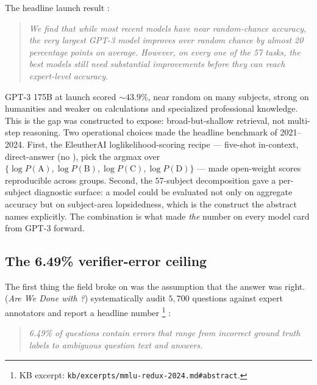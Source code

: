 The headline launch result
\citep[\S{}abstract]{hendrycks2021-mmlu}:

\begin{quote}\itshape
We find that while most recent models have near random-chance accuracy,
the very largest GPT-3 model improves over random chance by almost 20
percentage points on average. However, on every one of the 57 tasks,
the best models still need substantial improvements before they can
reach expert-level accuracy.
\end{quote}

GPT-3 175B at launch scored $\sim 43.9\%$, near random on many subjects,
strong on humanities and weaker on calculations and specialized
professional knowledge. This is the gap  was constructed to expose:
broad-but-shallow retrieval, not multi-step reasoning. Two operational
choices made  the headline benchmark of 2021--2024. First, the
EleutherAI \texttt{} loglikelihood-scoring recipe
\citep[\S{}\ref{sec:knowledge-mmlu}]{hendrycks2021-mmlu} --- five-shot
in-context, direct-answer (no ), pick the argmax over
$\{\log P(\text{A}), \log P(\text{B}), \log P(\text{C}),
\log P(\text{D})\}$ --- made open-weight scores reproducible across
groups. Second, the $57$-subject decomposition gave a per-subject
diagnostic surface: a model could be evaluated not only on aggregate
accuracy but on subject-area lopsidedness, which is the construct the
abstract names explicitly. The combination is what made  \emph{the}
number on every model card from GPT-3 forward.

\subsection{The 6.49\% verifier-error ceiling}
\label{sec:knowledge-redux}

The first thing the field broke on  was the assumption that the
answer  was right. \citet{mmlu-redux-2024} (\emph{Are We Done with
?}) systematically audit $5{,}700$  questions against expert
annotators and report a headline number%
\footnote{KB excerpt: \nolinkurl{kb/excerpts/mmlu-redux-2024.md#abstract}.}
\citep[\S{}abstract]{mmlu-redux-2024}:

\begin{quote}\itshape
6.49\% of  questions contain errors that range from incorrect
ground truth labels to ambiguous question text and answers.
\end{quote}

